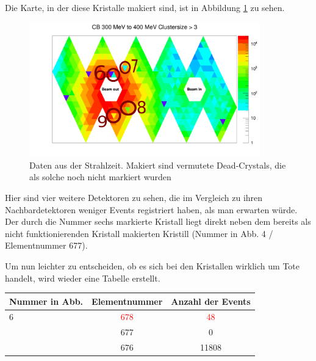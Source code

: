 \documentclass[a4paper,11pt,oneside,final,german,openbib,pdftex]{scrbook}
\begin{document}
{Die Karte, in der diese Kristalle makiert sind, ist in Abbildung \ref{fig:Vermutete-Dead-Crystals-Map} zu sehen.

\begin{figure}[h!]
	\begin{center}
		\includegraphics[width=100mm]{NewCalib/Strahlzeit2014/ClusterSizeNew/20172504StrahlzeitMoreDead}
	\end{center}
\caption[Strahlzeit: Symmetrische Photonen; Vermutliche Dead-Crystals]{Daten aus der Strahlzeit. Makiert sind vermutete Dead-Crystals, die als solche noch nicht markiert wurden}
\label{fig:Vermutete-Dead-Crystals-Map}

\end{figure}

 Hier sind vier weitere Detektoren zu sehen, die im Vergleich zu ihren Nachbardetektoren weniger Events registriert haben, als man erwarten w\"urde. Der durch die Nummer sechs markierte Kristall liegt direkt neben dem bereits als nicht funktionierenden Kristall makierten Kristill (Nummer in Abb. 4 / Elementnummer 677). 
 
 Um nun leichter zu entscheiden, ob es sich bei den Kristallen wirklich um Tote handelt, wird wieder eine Tabelle erstellt.
 
 
 \begin{table}[h!]
 \begin{center}
 	
 \begin{tabular}{|l|c|c|}
 
 	\hline
 	Nummer in Abb. & Elementnummer&Anzahl der Events \\
	 \hline
 	\hline
 	6& \textcolor{red}{678} &\textcolor{red}{48} \\
 	\cline{2-3} 
 	 & 677&0 \\
 	\cline{2-3}
 	 & 676& 11808\\ 
 	

\end{tabular}
\end{center}
\end{table}}
\end{document}
